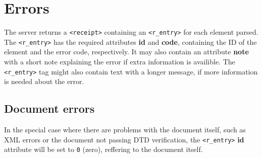 \newpage
\section{Errors}
\label{sec:errors}

The server returns a \texttt{<receipt>} containing an \texttt{<r\_entry>} for 
each element parsed. The \texttt{<r\_entry>} has the required attributes 
\textbf{id} and \textbf{code}, containing the ID of the element and the error 
code, respectively. It may also contain an attribute \textbf{note} with a short 
note explaining the error if extra information is availible. The 
\texttt{<r\_entry>} tag might also contain text with a longer message, if more 
information is needed about the error. 

\subsection{Document errors}

In the special case where there are problems with the document itself, such as 
XML errors or the document not passing DTD verification, the \texttt{<r\_entry>} 
\textbf{id} attribute will be set to \texttt{0} (zero), reffering to the 
document itself. 
